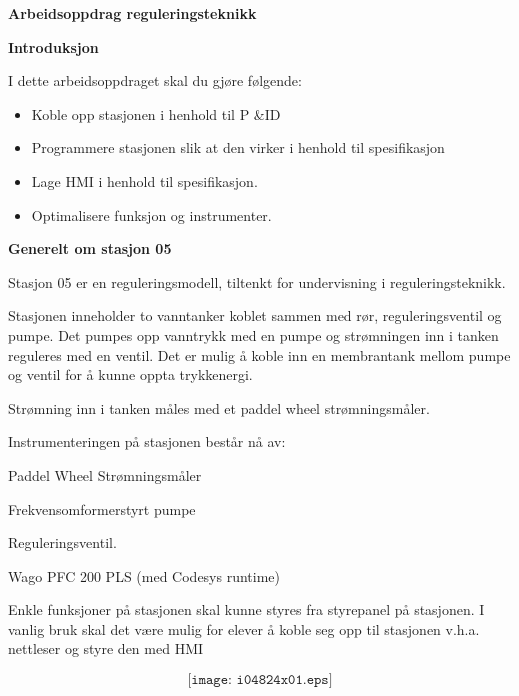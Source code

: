 

\noindent

\vskip 5pt



\vskip 5pt
\begin{center}
\textbf{Arbeidsoppdrag reguleringsteknikk}
\vskip 5pt 
\vskip 5pt 
\end{center}

\vskip 10pt 
\textbf{Introduksjon}

\vskip 5pt 
I dette arbeidsoppdraget skal du gjøre følgende:
\begin{itemize}[noitemsep]
	\item Koble opp stasjonen i henhold til P \&ID
	\item Programmere stasjonen slik at den virker i henhold til spesifikasjon
	\item Lage HMI i henhold til spesifikasjon. 
	\item Optimalisere funksjon og instrumenter. 
\end{itemize}

\textbf{Generelt om stasjon 05}

Stasjon 05 er en reguleringsmodell, tiltenkt for undervisning i reguleringsteknikk.  

Stasjonen inneholder to vanntanker koblet sammen med rør, reguleringsventil og pumpe. Det pumpes opp vanntrykk med en pumpe og strømningen inn i tanken reguleres med en ventil. Det er mulig å koble inn en membrantank mellom pumpe og ventil for å kunne oppta trykkenergi.  

Strømning inn i tanken måles med et paddel wheel strømningsmåler.   

Instrumenteringen på stasjonen består nå av:  

Paddel Wheel Strømningsmåler 

Frekvensomformerstyrt pumpe 

Reguleringsventil. 

Wago PFC 200 PLS (med Codesys runtime) 


Enkle funksjoner på stasjonen skal kunne styres fra styrepanel på stasjonen. I vanlig bruk skal det være mulig for elever å koble seg opp til stasjonen v.h.a. nettleser og styre den med HMI

$$\texttt{[image: i04824x01.eps]}$$\\


